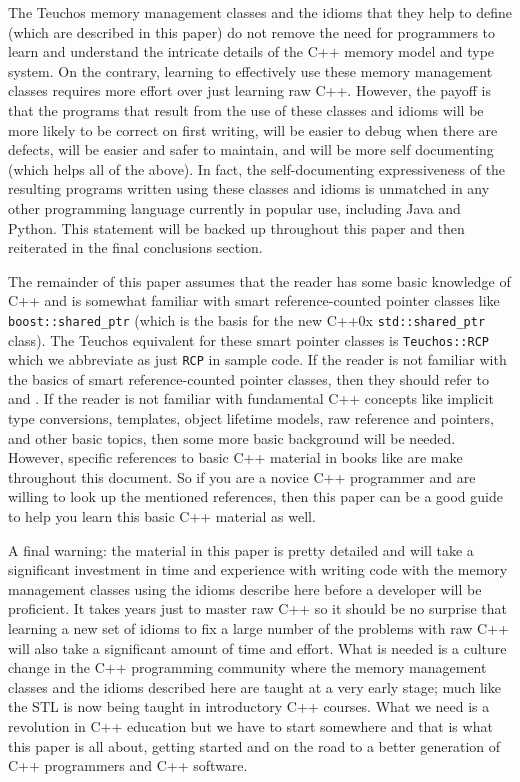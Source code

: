 \documentclass[pdf,ps2pdf,11pt]{SANDreport}
\begin{document}
The Teuchos memory management classes and the idioms that they help to
define (which are described in this paper) do not remove the need for
programmers to learn and understand the intricate details of the C++
memory model and type system.  On the contrary, learning to
effectively use these memory management classes requires more effort
over just learning raw C++.  However, the payoff is that the programs
that result from the use of these classes and idioms will be more
likely to be correct on first writing, will be easier to debug when
there are defects, will be easier and safer to maintain, and will be
more self documenting (which helps all of the above).  In fact, the
self-documenting expressiveness of the resulting programs written
using these classes and idioms is unmatched in any other programming
language currently in popular use, including Java and Python.  This
statement will be backed up throughout this paper and then reiterated
in the final conclusions section.

The remainder of this paper assumes that the reader has some basic
knowledge of C++ and is somewhat familiar with smart reference-counted
pointer classes like {}\texttt{boost::shared\_ptr} (which is the basis
for the new C++0x {}\texttt{std::shared\_ptr} class).  The Teuchos
equivalent for these smart pointer classes is {}\texttt{Teuchos::RCP}
which we abbreviate as just {}\texttt{RCP} in sample code.  If the
reader is not familiar with the basics of smart reference-counted
pointer classes, then they should refer to
{}\cite{RefCountPtrBeginnersGuide} and {}\cite{C++CodingStandards05}.
If the reader is not familiar with fundamental C++ concepts like
implicit type conversions, templates, object lifetime models, raw
reference and pointers, and other basic topics, then some more basic
background will be needed.  However, specific references to basic C++
material in books like {}\cite{EffectiveC++ThirdEdition, stroustrup97,
C++CodingStandards05} are make throughout this document.  So if you
are a novice C++ programmer and are willing to look up the mentioned
references, then this paper can be a good guide to help you learn this
basic C++ material as well.

A final warning: the material in this paper is pretty detailed and
will take a significant investment in time and experience with writing
code with the memory management classes using the idioms describe here
before a developer will be proficient.  It takes years just to master
raw C++ so it should be no surprise that learning a new set of idioms
to fix a large number of the problems with raw C++ will also take a
significant amount of time and effort.  What is needed is a culture
change in the C++ programming community where the memory management
classes and the idioms described here are taught at a very early
stage; much like the STL is now being taught in introductory C++
courses.  What we need is a revolution in C++ education but we have to
start somewhere and that is what this paper is all about, getting
started and on the road to a better generation of C++ programmers and
C++ software.
\end{document}
